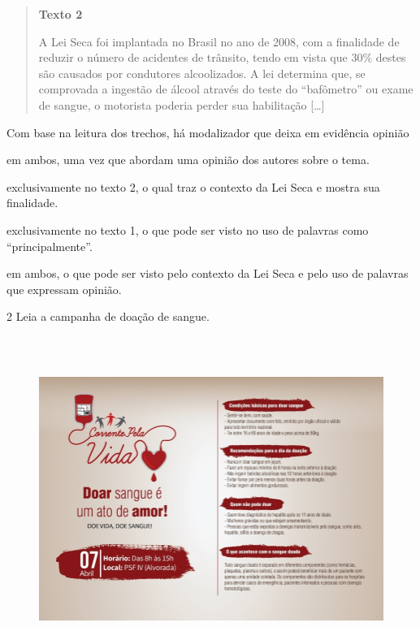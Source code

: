 \begin{quote}
\textbf{Texto 2}

A Lei Seca foi implantada no Brasil no ano de 2008, com a finalidade de
reduzir o número de acidentes de trânsito, tendo em vista que 30\%
destes são causados por condutores alcoolizados. A lei determina que, se
comprovada a ingestão de álcool através do teste do ``bafômetro'' ou
exame de sangue, o motorista poderia perder sua habilitação
{[}\ldots{}{]}

\end{quote}

Com base na leitura dos trechos, há modalizador que deixa em evidência
opinião

\begin{escolha}
\item em ambos, uma vez que abordam uma opinião dos autores sobre o tema.

\item exclusivamente no texto 2, o qual traz o contexto da Lei Seca e
mostra sua finalidade.

\item exclusivamente no texto 1, o que pode ser visto no uso de palavras
como ``principalmente''.

\item em ambos, o que pode ser visto pelo contexto da Lei Seca e pelo uso
de palavras que expressam opinião.
\end{escolha}

\num{2} Leia a campanha de doação de sangue.

\begin{figure}
\centering
\includegraphics[width=5.90556in,height=4.16829in]{./_SAEB_9_POR/media/image22.png}
\end{figure}


